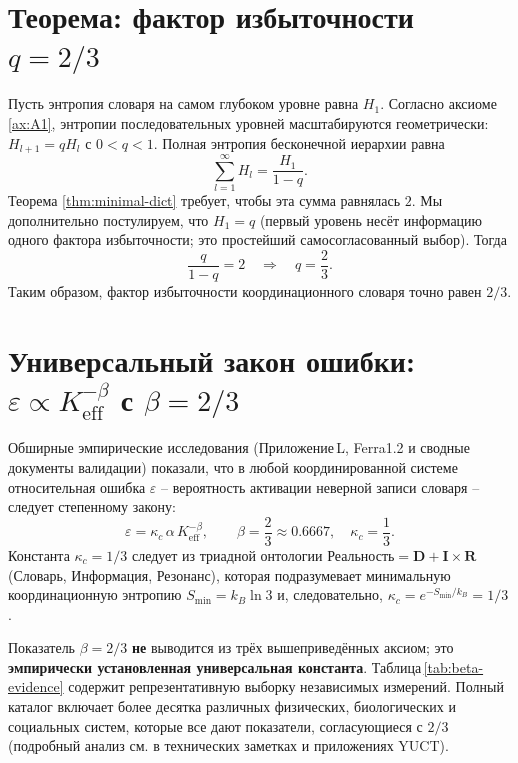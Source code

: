 \documentclass[11pt,a4paper]{article}
\begin{document}
	
	\section{Теорема: фактор избыточности \(q = 2/3\)}
	
	Пусть энтропия словаря на самом глубоком уровне равна \(H_1\).  Согласно аксиоме \ref{ax:A1}, энтропии последовательных уровней масштабируются геометрически: \(H_{l+1} = q H_l\) с \(0 < q < 1\).  Полная энтропия бесконечной иерархии равна
	\[
	\sum_{l=1}^{\infty} H_l = \frac{H_1}{1-q}.
	\]
	Теорема \ref{thm:minimal-dict} требует, чтобы эта сумма равнялась \(2\).  Мы дополнительно постулируем, что \(H_1 = q\) (первый уровень несёт информацию одного фактора избыточности; это простейший самосогласованный выбор).  Тогда
	\begin{equation}
		\frac{q}{1-q} = 2 \quad\Longrightarrow\quad \boxed{q = \frac{2}{3}}.
		\label{eq:q}
	\end{equation}
	Таким образом, фактор избыточности координационного словаря точно равен \(2/3\).
	
	\section{Универсальный закон ошибки: \(\varepsilon \propto K_{\mathrm{eff}}^{-\beta}\) с \(\beta = 2/3\)}
	
	Обширные эмпирические исследования (Приложение L, Ferra1.2 и сводные документы валидации) показали, что в любой координированной системе относительная ошибка \(\varepsilon\) – вероятность активации неверной записи словаря – следует степенному закону:
	\begin{equation}
		\boxed{\varepsilon = \kappa_c \, \alpha \, K_{\mathrm{eff}}^{-\beta}, \qquad \beta = \frac{2}{3} \approx 0.6667,\quad \kappa_c = \frac{1}{3}}.
		\label{eq:error-law}
	\end{equation}
	Константа \(\kappa_c = 1/3\) следует из триадной онтологии \(\text{Реальность} = \mathbf{D} + \mathbf{I} \times \mathbf{R}\) (Словарь, Информация, Резонанс), которая подразумевает минимальную координационную энтропию \(S_{\min} = k_B \ln 3\) и, следовательно, \(\kappa_c = e^{-S_{\min}/k_B} = 1/3\).
	
	Показатель \(\beta = 2/3\) \textbf{не} выводится из трёх вышеприведённых аксиом; это \textbf{эмпирически установленная универсальная константа}.  Таблица \ref{tab:beta-evidence} содержит репрезентативную выборку независимых измерений.  Полный каталог включает более десятка различных физических, биологических и социальных систем, которые все дают показатели, согласующиеся с \(2/3\) (подробный анализ см. в технических заметках и приложениях YUCT).
	
\end{document}
